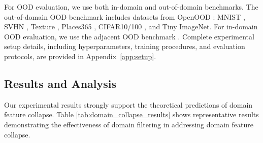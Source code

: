 \documentclass[11pt, oneside]{book}
\theoremstyle{plain}
\theoremstyle{definition}
\theoremstyle{remark}
\begin{document}
For OOD evaluation, we use both in-domain and out-of-domain benchmarks. The out-of-domain OOD benchmark includes datasets from OpenOOD \citep{zhang2023openood}: MNIST \citep{lecun1998gradient}, SVHN \citep{netzer2011reading}, Texture \citep{cimpoi2014describing}, Places365 \citep{zhou2017places}, CIFAR10/100 \citep{cifar10}, and Tiny ImageNet. For in-domain OOD evaluation, we use the adjacent OOD benchmark \citep{yangcan}. Complete experimental setup details, including hyperparameters, training procedures, and evaluation protocols, are provided in Appendix~\ref{app:setup}.

\subsection{Results and Analysis}

Our experimental results strongly support the theoretical predictions of domain feature collapse. Table \ref{tab:domain_collapse_results} shows representative results demonstrating the effectiveness of domain filtering in addressing domain feature collapse.
\end{document}
